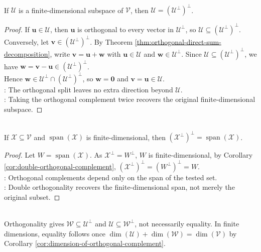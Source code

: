 \begin{corollary} \label{cor:double-orthogonal-complement} \\
If $\mathcal{U}$ is a finite-dimensional subspace of $\mathcal{V}$, then $\mathcal{U}=(\mathcal{U}^{\perp})^{\perp}$.
\begin{proof}
If $\mathbf{u}\in\mathcal{U}$, then $\mathbf{u}$ is orthogonal to every vector in $\mathcal{U}^{\perp}$, so $\mathcal{U}\subseteq(\mathcal{U}^{\perp})^{\perp}$. Conversely, let $\mathbf{v}\in(\mathcal{U}^{\perp})^{\perp}$. By Theorem \ref{thm:orthogonal-direct-sum-decomposition}, write $\mathbf{v}=\mathbf{u}+\mathbf{w}$ with $\mathbf{u}\in\mathcal{U}$ and $\mathbf{w}\in\mathcal{U}^{\perp}$. Since $\mathcal{U}\subseteq(\mathcal{U}^{\perp})^{\perp}$, we have $\mathbf{w}=\mathbf{v}-\mathbf{u}\in(\mathcal{U}^{\perp})^{\perp}$.\\
Hence $\mathbf{w}\in\mathcal{U}^{\perp}\cap(\mathcal{U}^{\perp})^{\perp}$, so $\mathbf{w}=\mathbf{0}$ and $\mathbf{v}=\mathbf{u}\in\mathcal{U}$.\\
: The orthogonal split leaves no extra direction beyond $\mathcal{U}$.\\
: Taking the orthogonal complement twice recovers the original finite-dimensional subspace.
\end{proof}
\end{corollary}

\begin{corollary} \label{cor:double-orthogonal-complement-of-finite-span} \\
If $\mathcal{X}\subseteq\mathcal{V}$ and $\operatorname{span}(\mathcal{X})$ is finite-dimensional, then $(\mathcal{X}^{\perp})^{\perp}=\operatorname{span}(\mathcal{X})$.
\begin{proof}
Let $W=\operatorname{span}(\mathcal{X})$. As $\mathcal{X}^{\perp}=W^{\perp}$, $W$ is finite-dimensional, by Corollary \ref{cor:double-orthogonal-complement}, $(\mathcal{X}^{\perp})^{\perp}=(W^{\perp})^{\perp}=W$.\\
: Orthogonal complements depend only on the span of the tested set.\\
: Double orthogonality recovers the finite-dimensional span, not merely the original subset.
\end{proof}
\end{corollary}

\begin{perspective} \label{per:orthogonal-subspaces-versus-complements} \\
Orthogonality gives $\mathcal{W}\subseteq\mathcal{U}^{\perp}$ and $\mathcal{U}\subseteq\mathcal{W}^{\perp}$, not necessarily equality. In finite dimensions, equality follows once $\dim(\mathcal{U})+\dim(\mathcal{W})=\dim(\mathcal{V})$ by Corollary \ref{cor:dimension-of-orthogonal-complement}.
\end{perspective}


